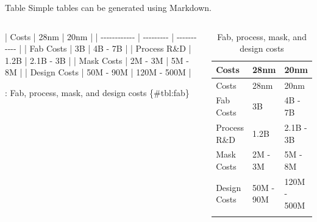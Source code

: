 \documentclass[
  10pt,
  ignorenonframetext,
  serif,onlymath]{beamer}
\newenvironment{Shaded}{}{}
\newcommand{\NormalTok}[1]{#1}
\newcommand{\PreprocessorTok}[1]{\textcolor[rgb]{0.74,0.48,0.00}{#1}}
\begin{document}
\begin{frame}[fragile]{Table}
\label{table}
Simple tables can be generated using Markdown.

\scriptsize

\begin{columns}

\begin{Shaded}
\begin{Highlighting}[]
\PreprocessorTok{|}\NormalTok{ Costs        }\PreprocessorTok{|}\NormalTok{ 28nm      }\PreprocessorTok{|}\NormalTok{ 20nm        }\PreprocessorTok{|}
\PreprocessorTok{| {-}{-}{-}{-}{-}{-}{-}{-}{-}{-}{-}{-}} \PreprocessorTok{| {-}{-}{-}{-}{-}{-}{-}{-}{-}} \PreprocessorTok{| {-}{-}{-}{-}{-}{-}{-}{-}{-}{-}{-}} \PreprocessorTok{|}
\PreprocessorTok{|}\NormalTok{ Fab Costs    }\PreprocessorTok{|}\NormalTok{ 3B        }\PreprocessorTok{|}\NormalTok{ 4B {-} 7B     }\PreprocessorTok{|}
\PreprocessorTok{|}\NormalTok{ Process R\&D  }\PreprocessorTok{|}\NormalTok{ 1.2B      }\PreprocessorTok{|}\NormalTok{ 2.1B {-} 3B   }\PreprocessorTok{|}
\PreprocessorTok{|}\NormalTok{ Mask Costs   }\PreprocessorTok{|}\NormalTok{ 2M {-} 3M   }\PreprocessorTok{|}\NormalTok{ 5M {-} 8M     }\PreprocessorTok{|}
\PreprocessorTok{|}\NormalTok{ Design Costs }\PreprocessorTok{|}\NormalTok{ 50M {-} 90M }\PreprocessorTok{|}\NormalTok{ 120M {-} 500M }\PreprocessorTok{|}

\NormalTok{: Fab, process, mask, and design}
\NormalTok{  costs \{\#tbl:fab\}}
\end{Highlighting}
\end{Shaded}


\begin{longtable}[]{@{}lll@{}}
\caption{\label{tbl:fab}Fab, process, mask, and design
costs}\tabularnewline
\toprule\noalign{}
Costs & 28nm & 20nm \\
\midrule\noalign{}
\endfirsthead
\toprule\noalign{}
Costs & 28nm & 20nm \\
\midrule\noalign{}
\endhead
Fab Costs & 3B & 4B - 7B \\
Process R\&D & 1.2B & 2.1B - 3B \\
Mask Costs & 2M - 3M & 5M - 8M \\
Design Costs & 50M - 90M & 120M - 500M \\
\bottomrule\noalign{}
\end{longtable}

\end{columns}
\end{frame}
\end{document}
